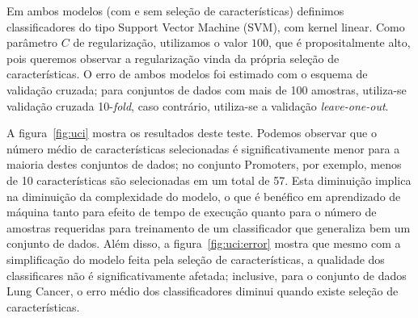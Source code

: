\documentclass[12pt]{article}
\newcommand{\foreignword}[1]{\textit{#1}}
\begin{document}
Em ambos modelos (com e sem seleção de características) definimos 
classificadores do tipo Support Vector Machine (SVM), com kernel linear.
Como parâmetro $C$ de regularização, utilizamos o valor $100$, que é 
propositalmente alto, pois queremos observar a regularização vinda da 
própria seleção de características. O erro de ambos modelos foi estimado 
com o esquema de validação cruzada; para conjuntos de dados com mais de 
100 amostras, utiliza-se validação cruzada 10-\foreignword{fold}, caso 
contrário, utiliza-se a validação \foreignword{leave-one-out}.

A figura~\ref{fig:uci} mostra os resultados deste teste. Podemos 
observar que o número médio de características selecionadas é 
significativamente menor para a maioria destes conjuntos de dados; no 
conjunto Promoters, por exemplo, menos de 10 características são 
selecionadas em um total de 57. Esta diminuição implica na diminuição
da complexidade do modelo, o que é benéfico em aprendizado de máquina 
tanto para efeito de tempo de execução quanto para o número de amostras 
requeridas para treinamento de um classificador que generaliza bem
um conjunto de dados. Além disso, a figura~\ref{fig:uci:error} mostra 
que mesmo com a simplificação do modelo feita pela seleção de 
características, a qualidade dos classificares não é significativamente
afetada; inclusive, para o conjunto de dados Lung Cancer, o erro médio 
dos classificadores diminui quando existe seleção de características.
\end{document}
